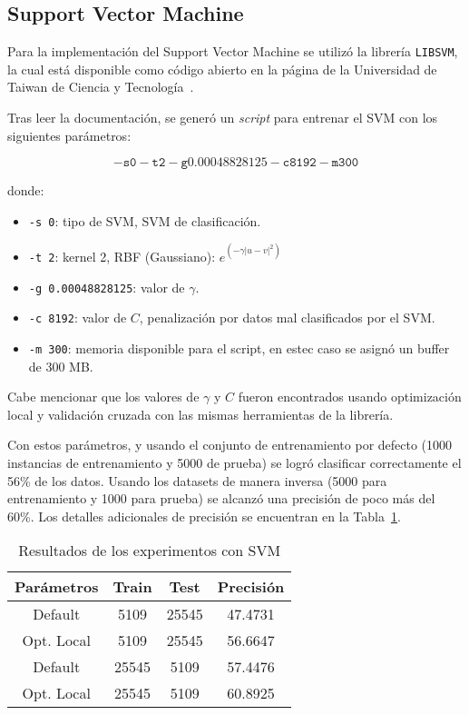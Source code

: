 \documentclass{llncs}
\begin{document}
\subsection{Support Vector Machine}
\label{subsec:svm}

Para la implementación del Support Vector Machine se utilizó la librería \texttt{LIBSVM}, la cual está disponible como código abierto en la página de la Universidad de Taiwan de Ciencia y Tecnología~\cite{LIBSVM}.

Tras leer la documentación, se generó un \textit{script} para entrenar el SVM con los siguientes parámetros:

$$\mathtt{-s 0 -t 2 -g 0.00048828125 -c 8192 -m 300}$$

donde:

\begin{itemize}
	\item \texttt{-s 0}: tipo de SVM, SVM de clasificación.
	\item \texttt{-t 2}: kernel 2, RBF (Gaussiano): $e^{(-\gamma |u-v|^2)}$
	\item \texttt{-g 0.00048828125}: valor de $\gamma$.
	\item \texttt{-c 8192}: valor de $C$, penalización por datos mal clasificados por el SVM.
	\item \texttt{-m 300}: memoria disponible para el script, en estec caso se asignó un buffer de 300 MB.
\end{itemize}

Cabe mencionar que los valores de $\gamma$ y $C$ fueron encontrados usando optimización local y validación cruzada con las mismas herramientas de la librería.

Con estos parámetros, y usando el conjunto de entrenamiento por defecto (1000 instancias de entrenamiento y 5000 de prueba) se logró clasificar correctamente el 56\% de los datos.
Usando los datasets de manera inversa (5000 para entrenamiento y 1000 para prueba) se alcanzó una precisión de poco más del 60\%.
Los detalles adicionales de precisión se encuentran en la Tabla~\ref{tab:svm}.

\begin{table}[htbp]
\centering
\caption{Resultados de los experimentos con SVM}
\label{tab:svm}
\begin{tabular}{@{}cccc@{}}
\toprule
Parámetros & Train & Test  & Precisión \\ \midrule
Default    & 5109  & 25545 & 47.4731   \\
Opt. Local & 5109  & 25545 & 56.6647   \\
Default    & 25545 & 5109  & 57.4476   \\
Opt. Local & 25545 & 5109  & 60.8925   \\ \bottomrule
\end{tabular}
\end{table}
\end{document}
